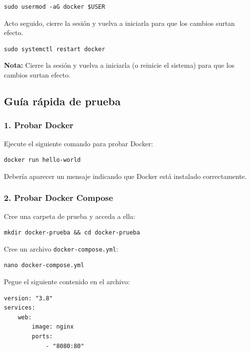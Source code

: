 \begin{lstlisting}[style=customstyle]
sudo usermod -aG docker $USER
\end{lstlisting}


Acto seguido, cierre la sesión y vuelva a iniciarla para que los cambios surtan efecto.
\begin{lstlisting}[style=customstyle]
sudo systemctl restart docker
\end{lstlisting}

\textbf{Nota:} Cierre la sesión y vuelva a iniciarla (o reinicie el sistema) para que los cambios surtan efecto.

\subsection{Guía rápida de prueba}

\subsubsection{1. Probar Docker}

Ejecute el siguiente comando para probar Docker:

\begin{lstlisting}[style=customstyle]
docker run hello-world
\end{lstlisting}

Debería aparecer un mensaje indicando que Docker está instalado correctamente.

\subsubsection{2. Probar Docker Compose}

Cree una carpeta de prueba y acceda a ella:

\begin{lstlisting}[style=customstyle]
mkdir docker-prueba && cd docker-prueba
\end{lstlisting}

Cree un archivo \texttt{docker-compose.yml}:

\begin{lstlisting}[style=customstyle]
nano docker-compose.yml
\end{lstlisting}

Pegue el siguiente contenido en el archivo:

\begin{lstlisting}[style=customstyle]
version: "3.8"
services:
    web:
        image: nginx
        ports:
            - "8080:80"
\end{lstlisting}

